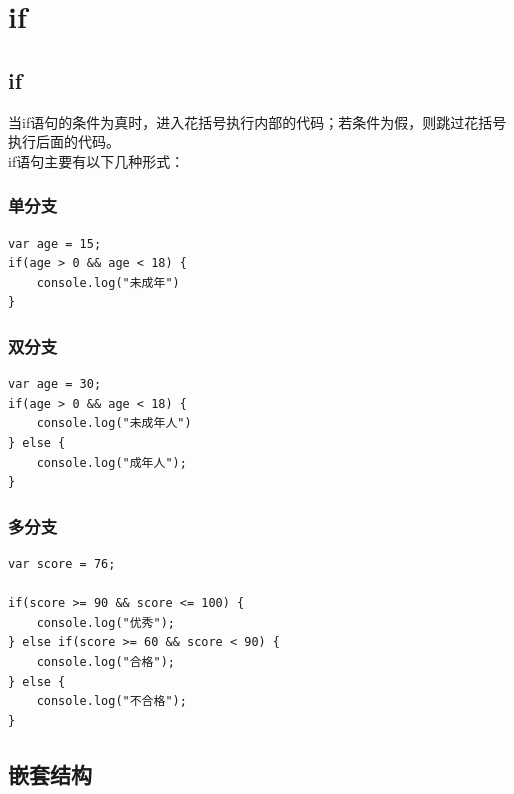 \newpage

\section{if}

\subsection{if}

当if语句的条件为真时，进入花括号执行内部的代码；若条件为假，则跳过花括号执行后面的代码。\\

if语句主要有以下几种形式：

\subsubsection{单分支}

\begin{lstlisting}[style=htmlcssjs]
var age = 15;
if(age > 0 && age < 18) {
    console.log("未成年")
}
\end{lstlisting}

\subsubsection{双分支}

\begin{lstlisting}[style=htmlcssjs]
var age = 30;
if(age > 0 && age < 18) {
    console.log("未成年人")
} else {
    console.log("成年人");
}
\end{lstlisting}

\subsubsection{多分支}

\begin{lstlisting}[style=htmlcssjs]
var score = 76;

if(score >= 90 && score <= 100) {
    console.log("优秀");
} else if(score >= 60 && score < 90) {
    console.log("合格");
} else {
    console.log("不合格");
}
\end{lstlisting}

\vspace{0.5cm}

\subsection{嵌套结构}

